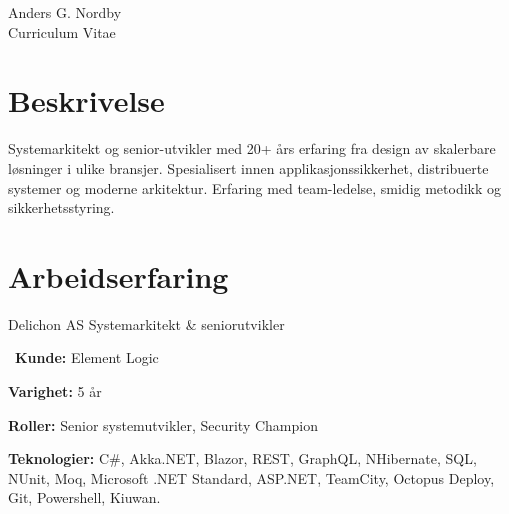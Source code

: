 \documentclass[10pt]{article} %
\begin{document}
\begin{paracol}{2} %


\parbox[top][0.12\textheight][c]{\linewidth}{ %
	\vspace{-0.04\textheight} %
	\centering %
	{\sffamily\Huge Anders G. Nordby}\\\medskip %
	{\Huge\color{headings}\cvtextfont Curriculum Vitae}
}


\section{Beskrivelse}

Systemarkitekt og senior-utvikler med 20+ års erfaring fra design av skalerbare løsninger i ulike bransjer. Spesialisert innen applikasjonssikkerhet, distribuerte systemer og moderne arkitektur. Erfaring med team-ledelse, smidig metodikk og sikkerhetsstyring.


\section{Arbeidserfaring} 

{}
{Delichon AS} 
{Systemarkitekt \& seniorutvikler} 
{\
\textbf{Kunde:} Element Logic

\textbf{Varighet:} 5 år

\textbf{Roller:} Senior systemutvikler, Security Champion

\textbf{Teknologier:} C\#, Akka.NET, Blazor, REST, GraphQL, NHibernate, SQL, NUnit, Moq, Microsoft .NET Standard, ASP.NET, TeamCity, Octopus Deploy, Git, Powershell, Kiuwan.
 
}
\end{paracol}
\end{document}
